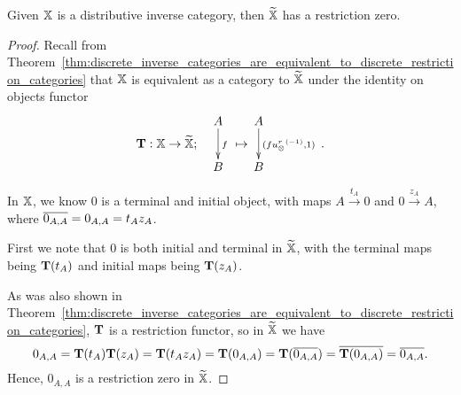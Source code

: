 \begin{lemma}\label{lem:x_tilde_has_a_restriction_zero}
  Given $\mathbb{X}$ is a distributive inverse category, then $\widetilde{\mathbb{X}}$ has a restriction zero.
\end{lemma}
\begin{proof}
  Recall from Theorem~\ref{thm:discrete_inverse_categories_are_equivalent_to_discrete_restriction_categories}
  that $\mathbb{X}$ is equivalent as a category to $\widetilde{\mathbb{X}}$ under the identity on objects
  functor
  \[
    {\raisebox{-18pt}{$\wtf:\X \to \Xt;$}} \quad
    \xymatrix{A\ar[d]^{f}\\B}\ \raisebox{-18pt}{$\mapsto$}\, \xymatrix{A\ar[d]^{(f\inv{\usr},1)}\\B}
    \,\raisebox{-18pt}{.}
  \]

  In $\mathbb{X}$, we know $0$ is a terminal and initial object, with maps
  $A \xrightarrow{t_A} 0 $ and $0 \xrightarrow{z_A} A$, where  $\overline{0_{A,A}} = 0_{A,A} = t_A z_A$.

  First we note that $0$ is both initial and terminal in $\widetilde{\mathbb{X}}$, with the terminal maps being
  $\mathbf{T}(t_A)$ and initial maps being $\mathbf{T}(z_A)$.

  As was also shown in
  Theorem~\ref{thm:discrete_inverse_categories_are_equivalent_to_discrete_restriction_categories},
$\mathbf{T}$ is a restriction functor, so in $\widetilde{\mathbb{X}}$ we have
  \[
    0_{A,A} = \mathbf{T}(t_A)\mathbf{T}(z_A) = \mathbf{T}(t_A z_A) = \mathbf{T}(0_{A,A}) = \mathbf{T}(\overline{0_{A,A}}) =
    \overline{\mathbf{T}(0_{A,A})} = \overline{0_{A,A}}.
  \]
  Hence, $0_{A,A}$ is a restriction zero in $\widetilde{\mathbb{X}}$.
\end{proof}

